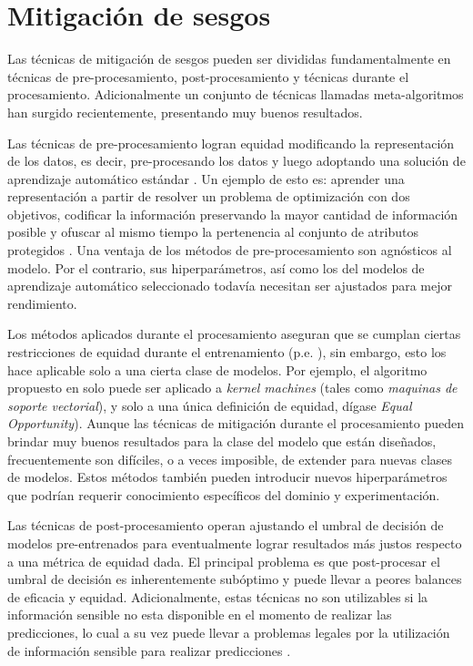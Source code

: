 \section{Mitigación de sesgos}\label{section:mitigation}


Las técnicas de mitigación de sesgos pueden ser divididas fundamentalmente en técnicas de pre-procesamiento, post-procesamiento y técnicas durante el procesamiento. Adicionalmente un conjunto de técnicas llamadas meta-algoritmos han surgido recientemente, presentando muy buenos resultados.

Las técnicas de pre-procesamiento logran equidad modificando la representación de los datos, es decir, pre-procesando los datos y luego adoptando una solución de aprendizaje automático estándar \parencite{nips2017preproc, Kamiran2011DataPT, zemel2013learning}.
Un ejemplo de esto es: aprender una representación a partir de resolver un problema de optimización con dos objetivos, codificar la información preservando la mayor cantidad de información posible y ofuscar al mismo tiempo la pertenencia al conjunto de atributos protegidos \parencite{zemel2013learning}.
Una ventaja de los métodos de pre-procesamiento son agnósticos al modelo.
Por el contrario, sus hiperparámetros, así como los del modelos de aprendizaje automático seleccionado todavía necesitan ser ajustados para mejor rendimiento.

Los métodos aplicados durante el procesamiento aseguran que se cumplan ciertas restricciones de equidad durante el entrenamiento (p.e. \parencite{donini2018empirical, zafar2017fairness, zafar2019fairness}), sin embargo, esto los hace aplicable solo a una cierta clase de modelos.
Por ejemplo, el algoritmo propuesto en \cite{donini2018empirical} solo puede ser aplicado a \emph{kernel machines} (tales como \emph{maquinas de soporte vectorial}), y solo a una única definición de equidad, dígase \emph{Equal Opportunity}).
Aunque las técnicas de mitigación durante el procesamiento pueden brindar muy buenos resultados para la clase del modelo que están diseñados, frecuentemente son difíciles, o a veces imposible, de extender para nuevas clases de modelos.
Estos métodos también pueden introducir nuevos hiperparámetros que podrían requerir conocimiento específicos del dominio y experimentación.

Las técnicas de post-procesamiento operan ajustando el umbral de decisión de modelos pre-entrenados para eventualmente lograr resultados más justos respecto a una métrica de equidad dada.
El principal problema es que post-procesar el umbral de decisión es inherentemente subóptimo y puede llevar a peores balances de eficacia y equidad.
Adicionalmente, estas técnicas no son utilizables si la información sensible no esta disponible en el momento de realizar las predicciones, lo cual a su vez puede llevar a problemas legales por la utilización de información sensible para realizar predicciones \parencite{MacCarthy2018StandardsOF}.

